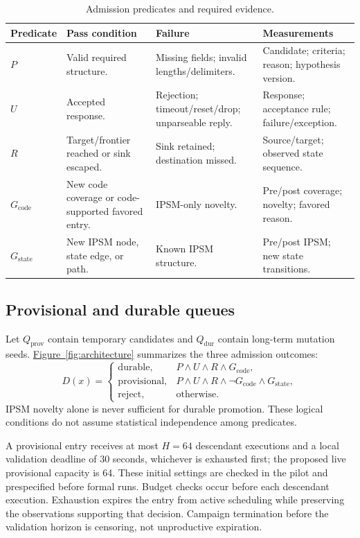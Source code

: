\documentclass[final,5p,times,number]{elsarticle}
\newcommand{\gcode}{G_{\mathrm{code}}}
\newcommand{\gstate}{G_{\mathrm{state}}}
\newcommand{\namedref}[2]{\hyperref[#2]{#1~\ref*{#2}}}
\begin{document}
\begin{table}[!tbp]
\centering\small
\caption{Admission predicates and required evidence.}
\label{tab:predicates}
\begin{tabularx}{\textwidth}{l Y Y Y}
\toprule
Predicate & Pass condition & Failure & Measurements \\
\midrule
$P$ & Valid required structure. & Missing fields; invalid lengths/delimiters. & Candidate; criteria; reason; hypothesis version. \\
$U$ & Accepted response. & Rejection; timeout/reset/drop; unparseable reply. & Response; acceptance rule; failure/exception. \\
$R$ & Target/frontier reached or sink escaped. & Sink retained; destination missed. & Source/target; observed state sequence. \\
$\gcode$ & New code coverage or code-supported favored entry. & IPSM-only novelty. & Pre/post coverage; novelty; favored reason. \\
$\gstate$ & New IPSM node, state edge, or path. & Known IPSM structure. & Pre/post IPSM; new state transitions. \\
\bottomrule
\end{tabularx}
\end{table}

\subsection{Provisional and durable queues}
Let $Q_{\mathrm{prov}}$ contain temporary candidates and $Q_{\mathrm{dur}}$ contain long-term mutation seeds. \namedref{Figure}{fig:architecture} summarizes the three admission outcomes:
\begin{equation}
D(x)=
\begin{cases}
\mathrm{durable}, & P\land U\land R\land\gcode,\\
\mathrm{provisional}, & P\land U\land R\land\neg\gcode\land\gstate,\\
\mathrm{reject}, & \text{otherwise}.
\end{cases}\label{eq:admission}
\end{equation}
IPSM novelty alone is never sufficient for durable promotion. These logical conditions do not assume statistical independence among predicates.

A provisional entry receives at most $H=64$ descendant executions and a local validation deadline of 30 seconds, whichever is exhausted first; the proposed live provisional capacity is 64. These initial settings are checked in the pilot and prespecified before formal runs. Budget checks occur before each descendant execution. Exhaustion expires the entry from active scheduling while preserving the observations supporting that decision. Campaign termination before the validation horizon is censoring, not unproductive expiration.
\end{document}
